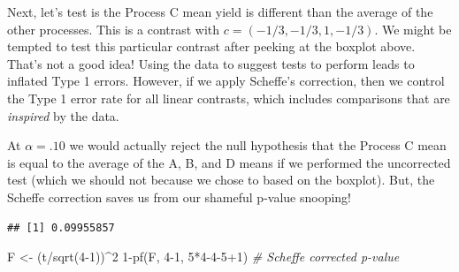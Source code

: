 \documentclass[
]{book}
\newenvironment{Shaded}{\begin{snugshade}}{\end{snugshade}}
\newcommand{\CommentTok}[1]{\textcolor[rgb]{0.56,0.35,0.01}{\textit{#1}}}
\newcommand{\DecValTok}[1]{\textcolor[rgb]{0.00,0.00,0.81}{#1}}
\newcommand{\FunctionTok}[1]{\textcolor[rgb]{0.00,0.00,0.00}{#1}}
\newcommand{\NormalTok}[1]{#1}
\newcommand{\OtherTok}[1]{\textcolor[rgb]{0.56,0.35,0.01}{#1}}
\newcommand{\SpecialCharTok}[1]{\textcolor[rgb]{0.00,0.00,0.00}{#1}}
\begin{document}
Next, let's test is the Process C mean yield is different than the average of the other processes. This is a contrast with \(c = (-1/3,-1/3,1,-1/3)\). We might be tempted to test this particular contrast after peeking at the boxplot above. That's not a good idea! Using the data to suggest tests to perform leads to inflated Type 1 errors. However, if we apply Scheff\textquotesingle e's correction, then we control the Type 1 error rate for all linear contrasts, which includes comparisons that are \emph{inspired} by the data.

At \(\alpha = .10\) we would actually reject the null hypothesis that the Process C mean is equal to the average of the A, B, and D means if we performed the uncorrected test (which we should not because we chose to based on the boxplot). But, the Scheff\textquotesingle e correction saves us from our shameful p-value snooping!

\begin{Shaded}
\end{Shaded}

\begin{verbatim}
## [1] 0.09955857
\end{verbatim}

\begin{Shaded}
\begin{Highlighting}[]
\NormalTok{F }\OtherTok{\textless{}{-}}\NormalTok{ (t}\SpecialCharTok{/}\FunctionTok{sqrt}\NormalTok{(}\DecValTok{4{-}1}\NormalTok{))}\SpecialCharTok{\^{}}\DecValTok{2}
\DecValTok{1}\SpecialCharTok{{-}}\FunctionTok{pf}\NormalTok{(F, }\DecValTok{4{-}1}\NormalTok{, }\DecValTok{5}\SpecialCharTok{*}\DecValTok{4{-}4{-}5}\SpecialCharTok{+}\DecValTok{1}\NormalTok{) }\CommentTok{\# Scheffe corrected p{-}value}
\end{Highlighting}
\end{Shaded}
\end{document}
